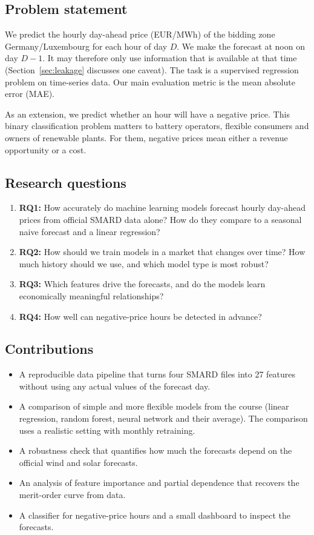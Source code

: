 \documentclass[12pt,oneside]{article}
\begin{document}
\subsection{Problem statement}

We predict the hourly day-ahead price (EUR/MWh) of the bidding zone Germany/Luxembourg for each hour of day $D$. We make the forecast at noon on day $D-1$. It may therefore only use information that is available at that time (Section~\ref{sec:leakage} discusses one caveat). The task is a supervised regression problem on time-series data. Our main evaluation metric is the mean absolute error (MAE).

As an extension, we predict whether an hour will have a negative price. This binary classification problem matters to battery operators, flexible consumers and owners of renewable plants. For them, negative prices mean either a revenue opportunity or a cost.

\subsection{Research questions}

\begin{enumerate}
    \item \textbf{RQ1:} How accurately do machine learning models forecast hourly day-ahead prices from official SMARD data alone? How do they compare to a seasonal naive forecast and a linear regression?
    \item \textbf{RQ2:} How should we train models in a market that changes over time? How much history should we use, and which model type is most robust?
    \item \textbf{RQ3:} Which features drive the forecasts, and do the models learn economically meaningful relationships?
    \item \textbf{RQ4:} How well can negative-price hours be detected in advance?
\end{enumerate}

\subsection{Contributions}

\begin{itemize}
    \item A reproducible data pipeline that turns four SMARD files into 27 features without using any actual values of the forecast day.
    \item A comparison of simple and more flexible models from the course (linear regression, random forest, neural network and their average). The comparison uses a realistic setting with monthly retraining.
    \item A robustness check that quantifies how much the forecasts depend on the official wind and solar forecasts.
    \item An analysis of feature importance and partial dependence that recovers the merit-order curve from data.
    \item A classifier for negative-price hours and a small dashboard to inspect the forecasts.
\end{itemize}
\end{document}
